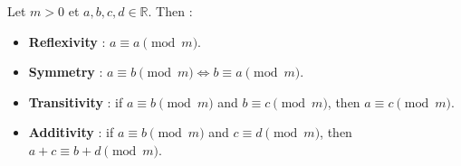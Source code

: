 \columnbreak
\begin{f}
	
	Let $m > 0$ et $a, b, c, d \in \mathbb{R}$. Then :
	
	\begin{itemize}
		\item \textbf{Reflexivity} : $a \equiv a \pmod{m}$.
		\item \textbf{Symmetry} : $a \equiv b \pmod{m} \iff b \equiv a \pmod{m}$.
		\item \textbf{Transitivity} : if $a \equiv b \pmod{m}$ and $b \equiv c \pmod{m}$, then $a \equiv c \pmod{m}$.
		\item \textbf{Additivity} : if $a \equiv b \pmod{m}$ and $c \equiv d \pmod{m}$, then $a + c \equiv b + d \pmod{m}$.
	\end{itemize}
	
\end{f}	

